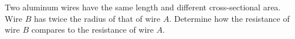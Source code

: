 Two aluminum wires have the same length and different cross-sectional 
area. Wire $B$ has twice the radius of that of wire $A$. Determine how 
the resistance of wire $B$ compares to the resistance of wire $A$.